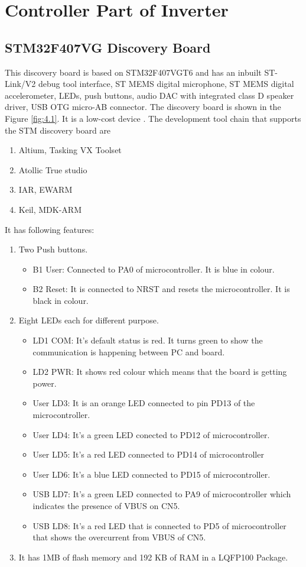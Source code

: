 \documentclass[a4paper,12pt]{iitmdiss}
\begin{document}
\chapter{Controller Part of Inverter}\label{chap: Controller Part of Inverter}
\section{STM32F407VG Discovery Board}
This discovery board is based on STM32F407VGT6 and has an inbuilt ST-Link/V2 debug tool interface, ST MEMS digital microphone, ST MEMS digital accelerometer, LEDs, push buttons, audio DAC with integrated class D speaker driver, USB OTG micro-AB connector. The discovery board is shown in the Figure \ref{fig:4.1}. It is a low-cost device \textcolor{blue}{\cite{um14722012stm32f4discovery}}. The development tool chain that supports the STM discovery board are
\begin{enumerate}
    \item Altium, Tasking VX Toolset
    \item Atollic True studio
    \item IAR, EWARM
    \item Keil, MDK-ARM
\end{enumerate}
It has following features:
\begin{enumerate}
    \item Two Push buttons.
    \begin{itemize}
        \item B1 User: Connected to PA0 of microcontroller. It is blue in colour.
        \item B2 Reset: It is connected to NRST and resets the microcontroller. It is black in colour.
    \end{itemize}
    \item Eight LEDs each for different purpose.
    \begin{itemize}
    \item LD1 COM: It's default status is red. It turns green to show the communication is happening between PC and board.
    \item LD2 PWR: It shows red colour which means that the board is getting power.
    \item User LD3: It is an orange LED connected to pin PD13 of the microcontroller.
    \item User LD4: It's a green LED conected to PD12 of microcontroller.
    \item User LD5: It's a red LED connected to PD14 of microcontroller
    \item User LD6: It's a blue LED connected to PD15 of microcontroller.
    \item USB LD7: It's a green LED connected to PA9 of microcontroller which indicates the presence of VBUS on CN5.
    \item USB LD8: It's a red LED that is connected to PD5 of microcontroller that shows the overcurrent from VBUS of CN5.
    \end{itemize}
    \item It has 1MB of flash memory and 192 KB of RAM in a LQFP100 Package.
    \end{enumerate}
\end{document}
